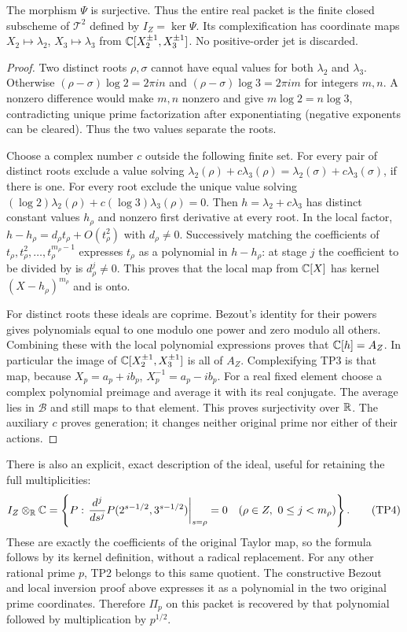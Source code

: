 \begin{theorem}
The morphism $\Psi$ is surjective. Thus the entire real packet is
the finite closed subscheme of $\mathcal T^2$ defined by
$I_Z=\ker\Psi$. Its complexification has coordinate maps
$X_2\mapsto\lambda_2$, $X_3\mapsto\lambda_3$ from
$\mathbb C[X_2^{\pm1},X_3^{\pm1}]$. No positive-order jet is discarded.
\end{theorem}
\begin{proof}
Two distinct roots $\rho,\sigma$ cannot have equal values for both
$\lambda_2$ and $\lambda_3$. Otherwise
$(\rho-\sigma)\log2=2\pi i n$ and
$(\rho-\sigma)\log3=2\pi i m$ for integers $m,n$. A nonzero
difference would make $m,n$ nonzero and give $m\log2=n\log3$,
contradicting unique prime factorization after exponentiating
(negative exponents can be cleared). Thus the two values separate
the roots.

Choose a complex number $c$ outside the following finite set.
For every pair of distinct roots exclude a value solving
$\lambda_2(\rho)+c\lambda_3(\rho)
=\lambda_2(\sigma)+c\lambda_3(\sigma)$, if there is one.
For every root exclude the unique value solving
$(\log2)\lambda_2(\rho)+c(\log3)\lambda_3(\rho)=0$.
Then $h=\lambda_2+c\lambda_3$ has distinct constant values
$h_\rho$ and nonzero first derivative at every root. In the local
factor, $h-h_\rho=d_\rho t_\rho+O(t_\rho^2)$ with
$d_\rho\ne0$. Successively matching the coefficients of
$t_\rho,t_\rho^2,\ldots,t_\rho^{m_\rho-1}$ expresses
$t_\rho$ as a polynomial in $h-h_\rho$: at stage $j$ the
coefficient to be divided by is $d_\rho^j\ne0$. This proves
that the local map from $\mathbb C[X]$ has kernel
$(X-h_\rho)^{m_\rho}$ and is onto.

For distinct roots these ideals are coprime. Bezout's identity for
their powers gives polynomials equal to one modulo one power and
zero modulo all others. Combining these with the local polynomial
expressions proves that $\mathbb C[h]=A_Z$. In particular the image of
$\mathbb C[X_2^{\pm1},X_3^{\pm1}]$ is all of $A_Z$. Complexifying TP3
is that map, because $X_p=a_p+ib_p$, $X_p^{-1}=a_p-ib_p$.
For a real fixed element choose a complex polynomial preimage and
average it with its real conjugate. The average lies in $\mathcal B$
and still maps to that element. This proves surjectivity over $\mathbb R$.
The auxiliary $c$ proves generation; it changes neither original
prime nor either of their actions.
\end{proof}

There is also an explicit, exact description of the ideal, useful
for retaining the full multiplicities:
\[
 I_Z\otimes_\mathbb R\mathbb C=
 \left\{P:\left.
 \frac{d^j}{ds^j}P(2^{s-1/2},3^{s-1/2})
 \right|_{s=\rho}=0\quad
 (\rho\in Z,\ 0\le j<m_\rho)\right\}.
 \tag{TP4}\label{tp:ideal}
\]
These are exactly the coefficients of the original Taylor map, so
the formula follows by its kernel definition, without a radical
replacement. For any other rational prime $p$, TP2 belongs to
this same quotient. The constructive Bezout and local inversion
proof above expresses it as a polynomial in the two original
prime coordinates. Therefore $\Pi_p$ on this packet is recovered
by that polynomial followed by multiplication by $p^{1/2}$.

